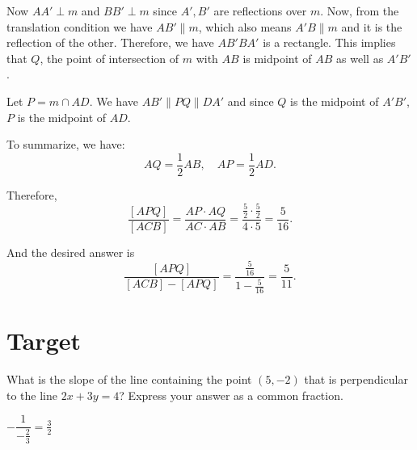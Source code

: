 \documentclass[11pt,twoside]{scrartcl}
\begin{document}
\begin{problem}
\begin{sketch}
        Now $AA' \perp m$ and $BB' \perp m$ since $A', B'$ are reflections over $m$. Now, from the translation condition we have $AB' \parallel m$, which also means $A'B \parallel m$ and it is the reflection of the other. Therefore, we have $AB'BA'$ is a rectangle. This implies that $Q$, the point of intersection of $m$ with $AB$ is midpoint of $AB$ as well as $A'B'$.
        
        Let $P = m \cap AD$. We have $AB' \parallel PQ \parallel DA'$ and since $Q$ is the midpoint of $A'B'$, $P$ is the midpoint of $AD$.
        
        To summarize, we have:
        \[ AQ = \frac{1}{2} AB, \quad AP = \frac{1}{2} AD. \]

        Therefore, 
        \[\frac{[APQ]}{[ACB]} = \frac{AP \cdot AQ}{AC \cdot AB} = \frac{\frac{5}{2}\cdot\frac{5}{2}}{4 \cdot 5} = \frac{5}{16}.\]

        And the desired answer is 
        \[\frac{[APQ]}{[ACB]-[APQ]} = \frac{\frac{5}{16}}{1-\frac{5}{16}} = \boxed{\frac{5}{11}}. \]        
    \end{sketch}
\end{problem}
\newpage
\section{Target}
\begin{problem}
    What is the slope of the line containing the point $ (5,-2) $ that is perpendicular to the line $ 2x+3y=4 $? Express your answer as a common fraction.
    \begin{sketch}
        $-\dfrac{1}{-\frac{2}{3}} = \boxed{\frac{3}{2}}$
    \end{sketch}
\end{problem}
\end{document}
